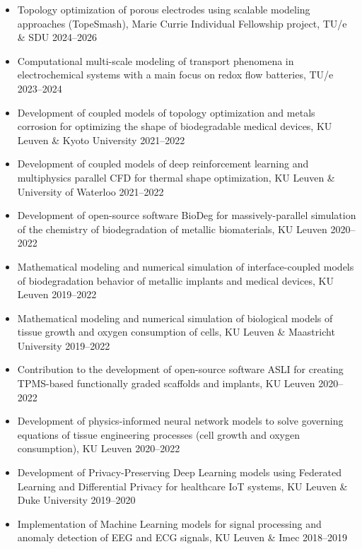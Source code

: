 \documentclass{cv}
\begin{document}
\begin{itemize} [itemsep=-0.2ex]
\item
Topology optimization of porous electrodes using scalable modeling approaches (TopeSmash), Marie Currie Individual Fellowship project, {TU/e \& SDU} \hfill 2024--2026
\item
Computational multi-scale modeling of transport phenomena in electrochemical systems with a main focus on redox flow batteries, {TU/e} \hfill 2023--2024
\item
Development of coupled models of topology optimization and metals corrosion for optimizing the shape of biodegradable medical devices, {KU Leuven \& Kyoto University} \hfill 2021--2022
\item
Development of coupled models of deep reinforcement learning and multiphysics parallel CFD for thermal shape optimization, KU Leuven \& University of Waterloo \hfill 2021--2022
\item
Development of open-source software BioDeg for massively-parallel simulation of the chemistry of biodegradation of metallic biomaterials, {KU Leuven} \hfill 2020--2022
\item
Mathematical modeling and numerical simulation of interface-coupled models of biodegradation behavior of metallic implants and medical devices, {KU Leuven} \hfill 2019--2022
\item
Mathematical modeling and numerical simulation of biological models of tissue growth and oxygen consumption of cells, {KU Leuven} \& Maastricht University \hfill 2019--2022
\item 
Contribution to the development of open-source software ASLI for creating TPMS-based functionally graded scaffolds and implants, KU Leuven \hfill 2020--2022
\item
Development of physics-informed neural network models to solve governing equations of tissue engineering processes (cell growth and oxygen consumption), {KU Leuven} \hfill 2020--2022
\item
Development of Privacy-Preserving Deep Learning models using Federated Learning and Differential Privacy for healthcare IoT systems, {KU Leuven \& Duke University} \hfill 2019--2020
\item
Implementation of Machine Learning models for signal processing and anomaly detection of EEG and ECG signals, {KU Leuven \& Imec} \hfill 2018--2019
\end{itemize}


\end{document}
